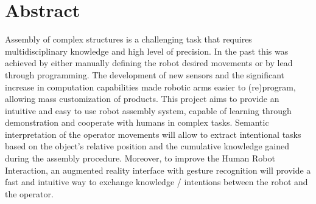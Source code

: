 \chapter*{Abstract}

Assembly of complex structures is a challenging task that requires multidisciplinary knowledge and high level of precision. In the past this was achieved by either manually defining the robot desired movements or by lead through programming. The development of new sensors and the significant increase in computation capabilities made robotic arms easier to (re)program, allowing mass customization of products. This project aims to provide an intuitive and easy to use robot assembly system, capable of learning through demonstration and cooperate with humans in complex tasks. Semantic interpretation of the operator movements will allow to extract intentional tasks based on the object's relative position and the cumulative knowledge gained during the assembly procedure. Moreover, to improve the Human Robot Interaction, an augmented reality interface with gesture recognition will provide a fast and intuitive way to exchange knowledge / intentions between the robot and the operator.
